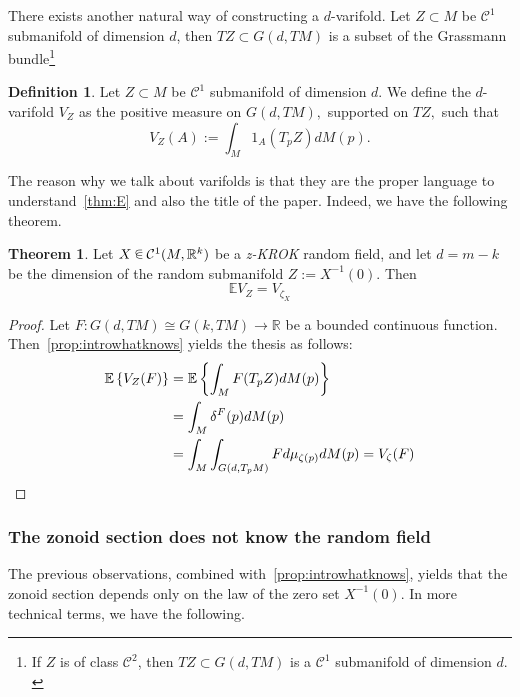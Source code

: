 \documentclass[10pt]{amsart}
\theoremstyle{definition}\newtheorem{defi}[theo]{Definition}\newtheorem{rema}[theo]{Remark}\newtheorem{exam}[theo]{Example}\newtheorem{exem}[theo]{Example}\newtheorem{nota}[theo]{Notation}
\newtheorem{mainthm}{Theorem}
\newcommand{\R}{\mathbb{R}}
\newcommand{\EE}{\mathbb{E}}
\newcommand{\mC}{\mathcal{C}}
\newcommand{\zkrok}{\emph{z-KROK}\xspace}
\newcommand*\randin{
\mathchoice {\raisebox{-.35ex}{$\displaystyle{^\subset}$}\mkern-11.5mu\raisebox{+.45ex}{$\displaystyle{_\subset}$}} {\mkern+1mu\raisebox{-.27ex}{$\textstyle{^\subset}$}\mkern-11.7mu\raisebox{+.45ex}{$\textstyle{_\subset}$}} {\raisebox{.35ex}{$\scriptstyle\subset$}\mkern-14mu\raisebox{-.15ex}{$\scriptstyle\subset$}} {\raisebox{.3ex}{$\scriptscriptstyle\subset$}\mkern-13.5mu\raisebox{-.10ex}{$\scriptscriptstyle\subset$}}}
\begin{document}
There exists another natural way of constructing a $d$-varifold. Let $Z\subset M$ be $\mC^1$ submanifold of dimension $d$, then $TZ\subset G(d,TM)$ is a subset of the Grassmann bundle\footnote{If $Z$ is of class $\mC^2$, then $TZ\subset G(d,TM)$ is a $\mC^1$ submanifold of dimension $d.$}

\begin{defi}
Let $Z\subset M$ be $\mC^1$ submanifold of dimension $d$. We define the $d$-varifold $V_{Z}$ as the positive measure on $G(d,TM),$ supported on $TZ,$ such that
\begin{equation*}
V_{Z}(A):=\int_M 1_A(T_pZ)dM(p).
\end{equation*}
\end{defi}

The reason why we talk about varifolds is that they are the proper language to understand~\cref{thm:E} and also the title of the paper. Indeed, we have the following theorem.

\begin{mainthm}\label{thm:title}
Let $X\,\randin\, \mC^1(M,\R^k)$ be a \zkrok random field, and let $d=m-k$ be the dimension of the random submanifold $Z:=X^{-1}(0).$ Then
\begin{equation*}
\EE V_Z=V_{\zeta_X}
\end{equation*}
\end{mainthm}


\begin{proof}
Let $F\colon G(d,TM)\cong G(k,TM)\to \R$ be a bounded continuous function. Then~\cref{prop:introwhatknows} yields the thesis as follows:
\begin{align*}
\EE\left\{ V_Z(F)\right\} &=\EE\left\{ \int_M F(T_pZ)dM(p)\right\}
\\
&= \int_M \delta^F(p) dM(p)
\\
&= \int_M \int_{G\left(d,T_pM\right)}Fd\mu_{\zeta(p)} dM(p)=V_{\zeta}(F)\qedhere
\end{align*}
\end{proof}


\subsubsection{The zonoid section does not know the random field}

The previous observations, combined with~\cref{prop:introwhatknows}, yields that the zonoid section depends only on the law of the zero set $X^{-1}(0)$. In more technical terms, we have the following.
\end{document}
